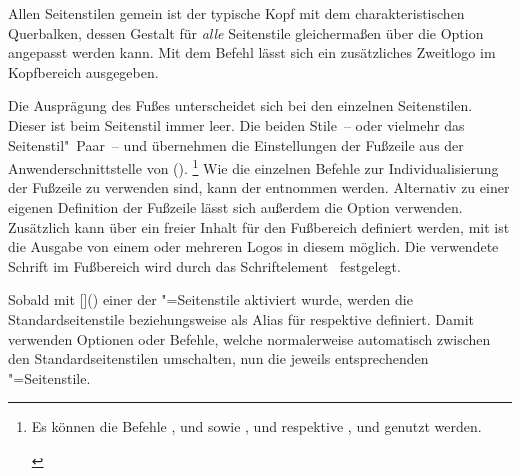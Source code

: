 \begin{Declaration*}{}
\begin{Declaration*}{}
\begin{Declaration*}{}
\begin{Declaration}[v2.02]{}
\begin{Declaration}[v2.02]{}
\begin{Declaration}[v2.02]{}
Allen Seitenstilen gemein ist der typische Kopf mit dem charakteristischen 
Querbalken, dessen Gestalt für \emph{alle} Seitenstile gleichermaßen über die 
Option  angepasst werden kann. Mit dem Befehl  
lässt sich ein zusätzliches Zweitlogo im Kopfbereich ausgegeben.

Die Ausprägung des Fußes unterscheidet sich bei den einzelnen Seitenstilen. 
Dieser ist beim Seitenstil  immer leer. Die beiden 
Stile~-- oder vielmehr das Seitenstil"~Paar~--  und 
 übernehmen die Einstellungen der Fußzeile aus der 
Anwenderschnittstelle von ().%
\footnote{%
  \begin{Bundle}{}%
  Es können die Befehle
  ,  und  sowie , 
   und  respektive ,  und 
   genutzt werden.%
  \end{Bundle}%
}
Wie die einzelnen Befehle zur Individualisierung der Fußzeile zu verwenden 
sind, kann der  entnommen werden. Alternativ 
zu einer eigenen Definition der Fußzeile lässt sich außerdem die Option 
 verwenden. Zusätzlich kann über  ein freier 
Inhalt für den Fußbereich definiert werden, mit  ist die 
Ausgabe von einem oder mehreren Logos in diesem möglich. Die verwendete Schrift 
im Fußbereich wird durch das Schriftelement~ festgelegt.

Sobald mit []() 
einer der "=Seitenstile aktiviert wurde, werden die 
Standardseitenstile  beziehungsweise  als 
Alias für  respektive  
definiert. Damit verwenden Optionen oder Befehle, welche normalerweise 
automatisch zwischen den Standardseitenstilen umschalten, nun die jeweils 
entsprechenden "=Seitenstile.


\end{Declaration}
\end{Declaration}
\end{Declaration}
\end{Declaration*}
\end{Declaration*}
\end{Declaration*}

